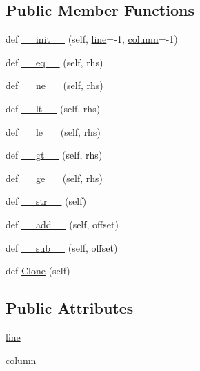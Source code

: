 \subsection*{Public Member Functions}
\begin{DoxyCompactItemize}
\item 
def \hyperlink{classpump_1_1Cursor_a17126ae70ca573c43e4d38b1ccd03015}{\+\_\+\+\_\+init\+\_\+\+\_\+} (self, \hyperlink{classpump_1_1Cursor_aee8d8b67360da7fc4e635540cb41d48c}{line}=-\/1, \hyperlink{classpump_1_1Cursor_ae73db76c3a845a82afb334633864254e}{column}=-\/1)
\item 
def \hyperlink{classpump_1_1Cursor_ab430cfd4cfd2fa2b57ea31b128e56f22}{\+\_\+\+\_\+eq\+\_\+\+\_\+} (self, rhs)
\item 
def \hyperlink{classpump_1_1Cursor_a7bcfe24fa4e5df6ed12f627b8d3b3ba3}{\+\_\+\+\_\+ne\+\_\+\+\_\+} (self, rhs)
\item 
def \hyperlink{classpump_1_1Cursor_a4f846e3cf80aa45853b1fb7a03863745}{\+\_\+\+\_\+lt\+\_\+\+\_\+} (self, rhs)
\item 
def \hyperlink{classpump_1_1Cursor_a7652488b46ecf1dfa4d0a83bff9411ab}{\+\_\+\+\_\+le\+\_\+\+\_\+} (self, rhs)
\item 
def \hyperlink{classpump_1_1Cursor_aa6109b9e7048e6260c2018a6d8878739}{\+\_\+\+\_\+gt\+\_\+\+\_\+} (self, rhs)
\item 
def \hyperlink{classpump_1_1Cursor_aeadc1924f4435a1a67fada88b0bce40a}{\+\_\+\+\_\+ge\+\_\+\+\_\+} (self, rhs)
\item 
def \hyperlink{classpump_1_1Cursor_ada8d922763be27a0b1745e94748de2c3}{\+\_\+\+\_\+str\+\_\+\+\_\+} (self)
\item 
def \hyperlink{classpump_1_1Cursor_a75b9a3cf0d49413437c8d4fc0d1d5ff3}{\+\_\+\+\_\+add\+\_\+\+\_\+} (self, offset)
\item 
def \hyperlink{classpump_1_1Cursor_a297cc8271af2aade66acb5fa5973a748}{\+\_\+\+\_\+sub\+\_\+\+\_\+} (self, offset)
\item 
def \hyperlink{classpump_1_1Cursor_af68c9be83b0af87db441b21bc6ce8114}{Clone} (self)
\end{DoxyCompactItemize}
\subsection*{Public Attributes}
\begin{DoxyCompactItemize}
\item 
\hyperlink{classpump_1_1Cursor_aee8d8b67360da7fc4e635540cb41d48c}{line}
\item 
\hyperlink{classpump_1_1Cursor_ae73db76c3a845a82afb334633864254e}{column}
\end{DoxyCompactItemize}


